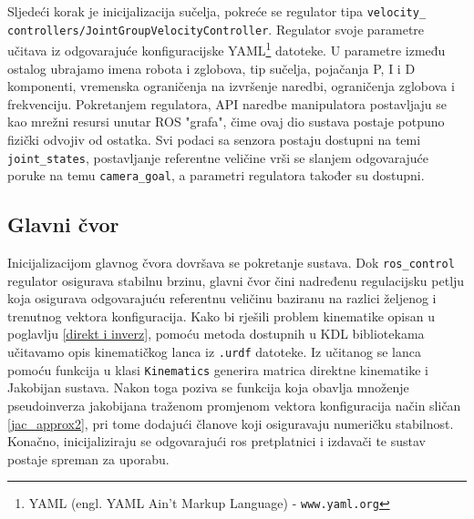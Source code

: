 \documentclass[times, utf8, diplomski, numeric]{fer}
\begin{document}
Sljedeći korak je inicijalizacija sučelja, pokreće se regulator tipa \texttt{velocity\_ controllers/JointGroupVelocityController}. 
Regulator svoje parametre učitava iz odgovarajuće konfiguracijske YAML\footnote{YAML (engl. YAML Ain't Markup Language) - \texttt{www.yaml.org}} datoteke.
U parametre između ostalog ubrajamo imena robota i zglobova, tip sučelja, pojačanja P, I i D komponenti, vremenska ograničenja na izvršenje naredbi, ograničenja zglobova i frekvenciju.
Pokretanjem regulatora, API naredbe manipulatora postavljaju se kao mrežni resursi unutar ROS "grafa", čime ovaj dio sustava postaje potpuno fizički odvojiv od ostatka.
Svi podaci sa senzora postaju dostupni na temi \texttt{joint\_states}, postavljanje referentne veličine vrši se slanjem odgovarajuće poruke na temu \texttt{camera\_goal}, a parametri regulatora također su dostupni.

\subsection{Glavni čvor}
Inicijalizacijom glavnog čvora dovršava se pokretanje sustava.
Dok \texttt{ros\_control} regulator osigurava stabilnu brzinu, glavni čvor čini nadređenu regulacijsku petlju koja osigurava odgovarajuću referentnu veličinu baziranu na razlici željenog i trenutnog vektora konfiguracija.
Kako bi rješili problem kinematike opisan u poglavlju \ref{direkt i inverz}, pomoću metoda dostupnih u KDL bibliotekama učitavamo opis kinematičkog lanca iz \texttt{.urdf} datoteke.
Iz učitanog se lanca pomoću funkcija u klasi \texttt{Kinematics} generira matrica direktne kinematike i Jakobijan sustava. 
Nakon toga poziva se funkcija koja obavlja množenje pseudoinverza jakobijana traženom promjenom vektora konfiguracija način sličan \ref{jac_approx2}, pri tome dodajući članove koji osiguravaju numeričku stabilnost.
Konačno, inicijaliziraju se odgovarajući ros pretplatnici i izdavači te sustav postaje spreman za uporabu.
\end{document}
